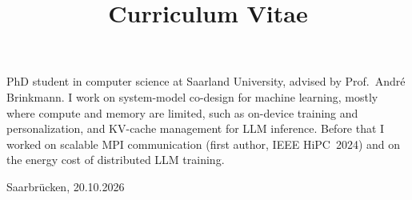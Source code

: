 \documentclass[a4paper,skipsamekey,11pt,english]{curve}
\title{Curriculum Vitae}
\begin{document}
\makeheaders[c]

PhD student in computer science at Saarland University, advised by Prof.\ Andr\'e Brinkmann. I work on system-model co-design for machine learning, mostly where compute and memory are limited, such as on-device training and personalization, and KV-cache management for LLM inference. Before that I worked on scalable MPI communication (first author, IEEE HiPC~2024) and on the energy cost of distributed LLM training.
\par





\vspace{1em}
\noindent Saarbr\"ucken, 20.10.2026
\end{document}
